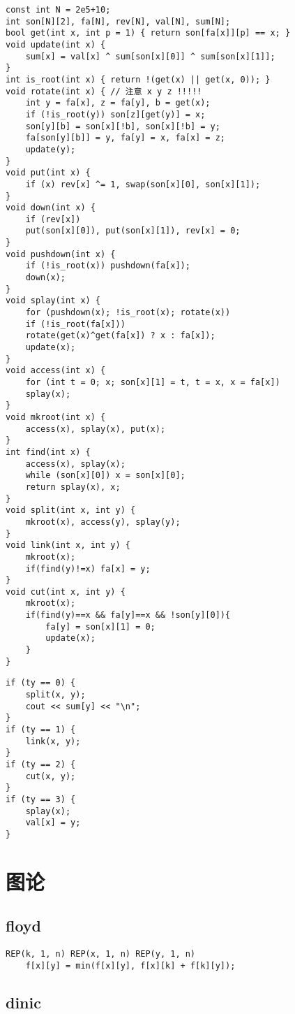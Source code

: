 \documentclass[a4paper,landscape,twocolumn]{ctexart}
\begin{document}
\begin{lstlisting}
const int N = 2e5+10;
int son[N][2], fa[N], rev[N], val[N], sum[N];
bool get(int x, int p = 1) { return son[fa[x]][p] == x; }
void update(int x) {
	sum[x] = val[x] ^ sum[son[x][0]] ^ sum[son[x][1]];
}
int is_root(int x) { return !(get(x) || get(x, 0)); }
void rotate(int x) { // 注意 x y z !!!!!
	int y = fa[x], z = fa[y], b = get(x);
	if (!is_root(y)) son[z][get(y)] = x;
	son[y][b] = son[x][!b], son[x][!b] = y;
	fa[son[y][b]] = y, fa[y] = x, fa[x] = z;
	update(y);
}
void put(int x) {
	if (x) rev[x] ^= 1, swap(son[x][0], son[x][1]);
}
void down(int x) {
	if (rev[x])
	put(son[x][0]), put(son[x][1]), rev[x] = 0;
}
void pushdown(int x) {
	if (!is_root(x)) pushdown(fa[x]);
	down(x);
}
void splay(int x) {
	for (pushdown(x); !is_root(x); rotate(x))
	if (!is_root(fa[x]))
	rotate(get(x)^get(fa[x]) ? x : fa[x]);
	update(x);
}
void access(int x) {
	for (int t = 0; x; son[x][1] = t, t = x, x = fa[x])
	splay(x);
}
void mkroot(int x) {
	access(x), splay(x), put(x);
}
int find(int x) {
	access(x), splay(x);
	while (son[x][0]) x = son[x][0];
	return splay(x), x;
}
void split(int x, int y) {
	mkroot(x), access(y), splay(y);
}
void link(int x, int y) {
	mkroot(x);
	if(find(y)!=x) fa[x] = y;
}
void cut(int x, int y) {
	mkroot(x);
	if(find(y)==x && fa[y]==x && !son[y][0]){
		fa[y] = son[x][1] = 0;
		update(x);
	}
}
\end{lstlisting}

\begin{lstlisting}
if (ty == 0) {
	split(x, y);
	cout << sum[y] << "\n";
}
if (ty == 1) {
	link(x, y);
}
if (ty == 2) {
	cut(x, y);
}
if (ty == 3) {
	splay(x);
	val[x] = y;
}
\end{lstlisting}

\section{图论}

\subsection{floyd}

\begin{lstlisting}
REP(k, 1, n) REP(x, 1, n) REP(y, 1, n)
	f[x][y] = min(f[x][y], f[x][k] + f[k][y]);
\end{lstlisting}

\subsection{dinic}
\end{document}
